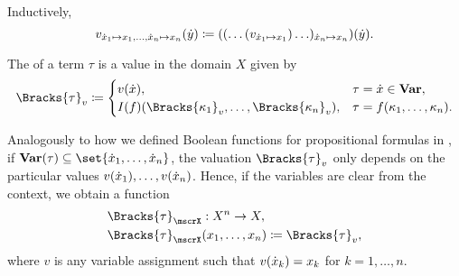 \begin{definition}
\begin{thmenum}
    Inductively,
    \begin{equation*}
      v_{{\dot{x}}_1 \mapsto x_1, \ldots, {\dot{x}}_n \mapsto x_n}({\dot{y}}) \coloneqq ((\ldots(v_{{\dot{x}}_1 \mapsto x_1})\ldots)_{{\dot{x}}_n \mapsto x_n})({\dot{y}}).
    \end{equation*}

     The  of a term \( \tau \) is a value in the domain \( X \) given by
    \begin{equation}\label{eq:def:first_order_valuation/term_valuation}
      \Bracks{\tau}_v \coloneqq \begin{cases}
        v(\synx),                                                 &\tau = \synx \in \op*{Var}, \\
        I(f)(\Bracks{\kappa_1}_v, \ldots, \Bracks{\kappa_n}_v), &\tau = f(\kappa_1, \ldots, \kappa_n).
      \end{cases}
    \end{equation}

     Analogously to how we defined Boolean functions for propositional formulas in , if \( \op*{Var}(\tau) \subseteq \set{ \synx_1, \ldots, \synx_n } \), the valuation \( \Bracks{\tau}_v \) only depends on the particular values \( v({\dot{x}}_1), \ldots, v({\dot{x}}_n) \). Hence, if the variables are clear from the context, we obtain a function
    \begin{equation*}
      \begin{aligned}
        &\Bracks{\tau}_\mscrX: X^n \to X, \\
        &\Bracks{\tau}_\mscrX(x_1, \ldots, x_n) \coloneqq \Bracks{\tau}_v,
      \end{aligned}
    \end{equation*}
    where \( v \) is any variable assignment such that \( v({\dot{x}}_k) = x_k \) for \( k = 1, \ldots, n \).


\end{thmenum}
\end{definition}
